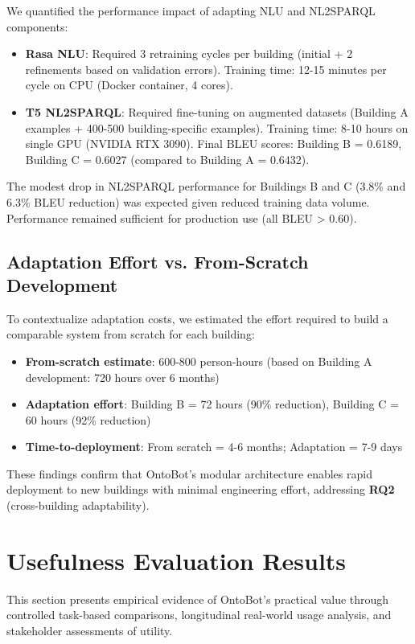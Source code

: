 \documentclass[acmlarge]{acmart}
\begin{document}
We quantified the performance impact of adapting NLU and NL2SPARQL components:

\begin{itemize}
    \item \textbf{Rasa NLU}: Required 3 retraining cycles per building (initial + 2 refinements based on validation errors). Training time: 12-15 minutes per cycle on CPU (Docker container, 4 cores).
    \item \textbf{T5 NL2SPARQL}: Required fine-tuning on augmented datasets (Building A examples + 400-500 building-specific examples). Training time: 8-10 hours on single GPU (NVIDIA RTX 3090). Final BLEU scores: Building B = 0.6189, Building C = 0.6027 (compared to Building A = 0.6432).
\end{itemize}

The modest drop in NL2SPARQL performance for Buildings B and C (3.8\% and 6.3\% BLEU reduction) was expected given reduced training data volume. Performance remained sufficient for production use (all BLEU > 0.60).

\subsection{Adaptation Effort vs. From-Scratch Development}

To contextualize adaptation costs, we estimated the effort required to build a comparable system from scratch for each building:

\begin{itemize}
    \item \textbf{From-scratch estimate}: 600-800 person-hours (based on Building A development: 720 hours over 6 months)
    \item \textbf{Adaptation effort}: Building B = 72 hours (90\% reduction), Building C = 60 hours (92\% reduction)
    \item \textbf{Time-to-deployment}: From scratch = 4-6 months; Adaptation = 7-9 days
\end{itemize}

These findings confirm that OntoBot's modular architecture enables rapid deployment to new buildings with minimal engineering effort, addressing \textbf{RQ2} (cross-building adaptability).

\section{Usefulness Evaluation Results}

This section presents empirical evidence of OntoBot's practical value through controlled task-based comparisons, longitudinal real-world usage analysis, and stakeholder assessments of utility.
\end{document}
